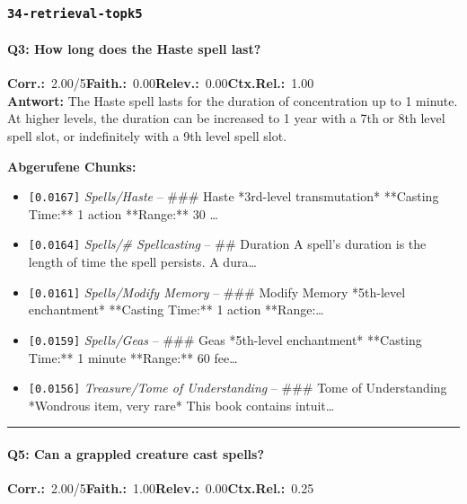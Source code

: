 \subsubsection*{\texttt{34-retrieval-topk5}}
\label{app:samples:34_retrieval_topk5}

\paragraph{Q3: How long does the Haste spell last?}
\noindent \textbf{Corr.:}~2.00/5\quad \textbf{Faith.:}~0.00\quad \textbf{Relev.:}~0.00\quad \textbf{Ctx.Rel.:}~1.00\\

\noindent\textbf{Antwort:} The Haste spell lasts for the duration of concentration up to 1 minute. At higher levels, the duration can be increased to 1 year with a 7th or 8th level spell slot, or indefinitely with a 9th level spell slot.

\noindent\textbf{Abgerufene Chunks:}
\begin{itemize}[noitemsep, topsep=2pt]
  \item[\textbf{\#1}] \texttt{[0.0167]} \textit{Spells/Haste} -- \#\#\# Haste  *3rd-level transmutation*  **Casting Time:** 1 action  **Range:** 30 \ldots
  \item[\textbf{\#2}] \texttt{[0.0164]} \textit{Spells/# Spellcasting} -- \#\# Duration  A spell's duration is the length of time the spell persists. A dura\ldots
  \item[\textbf{\#3}] \texttt{[0.0161]} \textit{Spells/Modify Memory} -- \#\#\# Modify Memory  *5th-level enchantment*  **Casting Time:** 1 action  **Range:\ldots
  \item[\textbf{\#4}] \texttt{[0.0159]} \textit{Spells/Geas} -- \#\#\# Geas  *5th-level enchantment*  **Casting Time:** 1 minute  **Range:** 60 fee\ldots
  \item[\textbf{\#5}] \texttt{[0.0156]} \textit{Treasure/Tome of Understanding} -- \#\#\# Tome of Understanding  *Wondrous item, very rare*  This book contains intuit\ldots
\end{itemize}
\vspace{4pt}
\hrule
\vspace{6pt}

\paragraph{Q5: Can a grappled creature cast spells?}
\noindent \textbf{Corr.:}~2.00/5\quad \textbf{Faith.:}~1.00\quad \textbf{Relev.:}~0.00\quad \textbf{Ctx.Rel.:}~0.25\\

